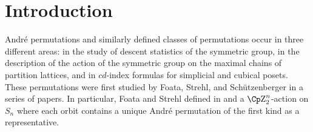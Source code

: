 \begin{abstract}
In this paper we exploit binary tree representations of permutations
to give a combinatorial proof of Purtill's result \cite{pur} that
$$
\rest{\sum_{\delta \in {\cal A}_n} v_{cd}(\delta)}
{\begin{array}{l} \scri c = a+b\\[-4pt] \scri d = ab+ba\\
\end{array}}= 
\sum_{\sigma \in S_n}v_{ab}(\sigma),
$$
where ${\cal A}_n$ is the set of Andr\'e permutations,
$v_{cd}(\sigma)$ is the $cd$-statistic of an Andr\'e permutation
and $v_{ab}(\sigma)$ is the $ab$-statistic of a permutation.
Using Purtill's proof as a motivation we introduce a new 
``Foata--Strehl-like'' action on permutations.  This $\Zzz
_2^{n-1}$-action allows us to give an elementary proof of Purtill's
theorem and a bijection between Andr\'e permutations of the first kind and
alternating permutations starting with a descent. A modified version of
our group action leads to a new class of Andr\'e-like permutations
with structure similar to that of simsun permutations.
\end{abstract}

\section*{Introduction}

Andr\'e permutations  and similarly defined classes of permutations
occur in three different areas: in the study of descent statistics of
the symmetric group, in the description of the action of the symmetric
group on the maximal chains of partition lattices, and in $cd$-index
formulas for simplicial and cubical posets. These permutations were
first studied by Foata, Strehl, and Sch\"utzenberger in a series of
papers. In particular, Foata and Strehl defined in
\cite{Foata-Strehl1} and \cite{Foata-Strehl2} a $\Zzz_2^n$-action on
$S_n$ where each  orbit contains a unique   Andr\'e permutation  of the first kind as a representative.   

